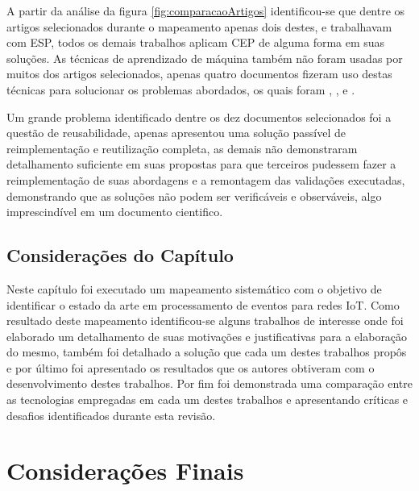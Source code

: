 \documentclass[ti,table]{texufpel} %
\begin{document}
  

  

A partir da análise da figura \ref{fig:comparacaoArtigos} identificou-se que dentre os artigos selecionados durante o mapeamento apenas dois destes, \cite{art1aslam2018towards} e \cite{art5chen2016dress} trabalhavam com ESP, todos os demais trabalhos aplicam CEP de alguma forma em suas soluções. As técnicas de aprendizado de máquina também não foram usadas por muitos dos artigos selecionados, apenas quatro documentos fizeram uso destas técnicas para solucionar os problemas abordados, os quais foram \cite{art1aslam2018towards}, \cite{art4akbar2017predictive}, \cite{art9kousiouris2018integrated} e \cite{art10soto2016ceml}.  

  

Um grande problema identificado dentre os dez documentos selecionados foi a questão de reusabilidade, apenas \cite{art2zimmerle2018web} apresentou uma solução passível de reimplementação e reutilização completa, as demais não demonstraram detalhamento suficiente em suas propostas para que terceiros pudessem  fazer a reimplementação de suas abordagens e a remontagem das validações executadas, demonstrando que as soluções não podem ser verificáveis e observáveis, algo imprescindível em um documento cientifico.  

  

\section{Considerações do Capítulo} 

  

Neste capítulo foi executado um mapeamento sistemático com o objetivo de identificar o estado da arte em processamento de eventos para redes IoT. Como resultado deste mapeamento identificou-se alguns trabalhos de interesse onde foi elaborado um detalhamento de suas motivações e justificativas para a elaboração do mesmo, também foi detalhado a solução que cada um destes trabalhos propôs e por último foi apresentado os resultados que os autores obtiveram com o desenvolvimento destes trabalhos. Por fim foi demonstrada uma comparação entre as tecnologias empregadas em cada um destes trabalhos e apresentando críticas e desafios identificados durante esta revisão.  

  


  

\chapter{Considerações Finais} 
\end{document}
